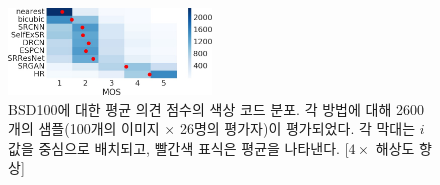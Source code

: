 \documentclass[10pt,twocolumn,letterpaper]{article}
\newcommand{\kor}[1]{#1}
\newcommand{\eng}[1]{}
\newcommand{\summary}[1]{}
\begin{document}
\summary{
SRGAN 및 SRResNet의 성능 평가와 손실 선택의 영향 조사. SRGAN-VGG54는 특히 더 뛰어난 성능을 보였음. 고수준의 VGG 기능 맵 $\phi_{5,4}$ 사용 시 높은 성능 보임.
}
\begin{figure}[ht!]
\includegraphics[width=0.48\textwidth]{images/used/jpg/MOS_heatmapcropped}
\caption{\eng{Color-coded distribution of MOS scores on \textbf{BSD100}. For each method 2600 samples (100 images $\times$ 26 raters) were assessed. Mean shown as red marker, where the bins are centered around value $i$. [$4\times$ upscaling]}\kor{BSD100에 대한 평균 의견 점수의 색상 코드 분포. 각 방법에 대해 2600개의 샘플(100개의 이미지 $\times$ 26명의 평가자)이 평가되었다. 각 막대는 $i$ 값을 중심으로 배치되고, 빨간색 표식은 평균을 나타낸다. [$4\times$ 해상도 향상]}}
\label{fig:MOS}
\end{figure}
\end{document}
